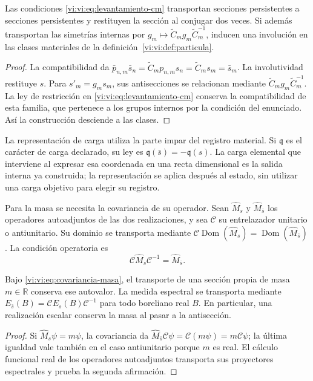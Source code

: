 \begin{proposition}
\label{vi:vi:prop:antiseccion-persistente}
Las condiciones \eqref{vi:vi:eq:levantamiento-cm} transportan secciones
persistentes a secciones persistentes y restituyen la sección al
conjugar dos veces. Si además transportan las simetrías internas por
$g_m\mapsto\widetilde C_mg_m\widetilde C_m^{-1}$, inducen una
involución en las clases materiales de la
definición~\ref{vi:vi:def:particula}.
\end{proposition}
\begin{proof}
La compatibilidad da
$\bar p_{n,m}\bar s_n=\widetilde C_mp_{n,m}s_n
=\widetilde C_ms_m=\bar s_m$.
La involutividad restituye $s$. Para $s'_m=g_ms_m$, sus
antisecciones se relacionan mediante
$\widetilde C_mg_m\widetilde C_m^{-1}$. La ley de restricción
en \eqref{vi:vi:eq:levantamiento-cm} conserva la compatibilidad de esta
familia, que pertenece a los grupos internos por la condición del
enunciado. Así la construcción desciende a las clases.
\end{proof}

La representación de carga utiliza la parte impar del registro
material. Si $\mathfrak q$ es el carácter de carga declarado, su
ley es $\mathfrak q(\bar s)=-\mathfrak q(s)$. La carga elemental
que interviene al expresar esa coordenada en una recta dimensional es
la salida interna ya construida; la representación se aplica después
al estado, sin utilizar una carga objetivo para elegir su registro.

Para la masa se necesita la covariancia de su operador. Sean
$\widehat M_s$ y $\widehat M_{\bar s}$ los operadores autoadjuntos
de las dos realizaciones, y sea $\mathcal C$ su entrelazador
unitario o antiunitario. Su dominio se transporta mediante
$\mathcal C\operatorname{Dom}(\widehat M_s)
=\operatorname{Dom}(\widehat M_{\bar s})$. La condición operatoria es
\begin{equation}
 \mathcal C\widehat M_s\mathcal C^{-1}
 =\widehat M_{\bar s}.
 \label{vi:vi:eq:covariancia-masa}
\end{equation}

\begin{proposition}
\label{vi:vi:prop:masa-conjugada}
Bajo \eqref{vi:vi:eq:covariancia-masa}, el transporte de una sección
propia de masa $m\in\mathbb R$ conserva ese autovalor. La medida
espectral se transporta mediante
$E_{\bar s}(B)=\mathcal C E_s(B)\mathcal C^{-1}$ para todo
boreliano real $B$. En particular, una realización escalar conserva
la masa al pasar a la antisección.
\end{proposition}
\begin{proof}
Si $\widehat M_s\psi=m\psi$, la covariancia da
$\widehat M_{\bar s}\mathcal C\psi
=\mathcal C(m\psi)=m\mathcal C\psi$; la última igualdad
vale también en el caso antiunitario porque $m$ es real. El cálculo
funcional real de los operadores autoadjuntos transporta sus
proyectores espectrales y prueba la segunda afirmación.
\end{proof}

